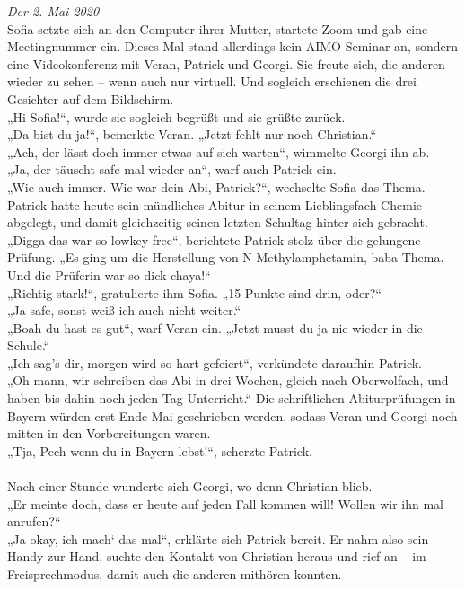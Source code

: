 \documentclass[oneside]{memoir}
\begin{document}
\textit{Der 2. Mai 2020} \\
Sofia setzte sich an den Computer ihrer Mutter, startete Zoom und gab eine Meetingnummer ein. Dieses Mal stand allerdings kein AIMO-Seminar an, sondern eine Videokonferenz mit Veran, Patrick und Georgi. Sie freute sich, die anderen wieder zu sehen – wenn auch nur virtuell. Und sogleich erschienen die drei Gesichter auf dem Bildschirm. \\
„Hi Sofia!“, wurde sie sogleich begrüßt und sie grüßte zurück. \\
„Da bist du ja!“, bemerkte Veran. „Jetzt fehlt nur noch Christian.“ \\
„Ach, der lässt doch immer etwas auf sich warten“, wimmelte Georgi ihn ab. \\
„Ja, der täuscht safe mal wieder an“, warf auch Patrick ein. \\
„Wie auch immer. Wie war dein Abi, Patrick?“, wechselte Sofia das Thema. Patrick hatte 
heute sein mündliches Abitur in seinem Lieblingsfach Chemie abgelegt, und damit 
gleichzeitig seinen letzten Schultag hinter sich gebracht. \\
„Digga das war so lowkey free“, berichtete Patrick stolz über die gelungene Prüfung. „Es ging um die Herstellung von N-Methylamphetamin, baba Thema. Und die Prüferin war so dick chaya!“ \\
„Richtig stark!“, gratulierte ihm Sofia. „15 Punkte sind drin, oder?“ \\
„Ja safe, sonst weiß ich auch nicht weiter.“ \\
„Boah du hast es gut“, warf Veran ein. „Jetzt musst du ja nie wieder in die Schule.“ \\
„Ich sag's dir, morgen wird so hart gefeiert“, verkündete daraufhin Patrick. \\
„Oh mann, wir schreiben das Abi in drei Wochen, gleich nach Oberwolfach, und haben bis 
dahin noch jeden Tag Unterricht.“ Die schriftlichen Abiturprüfungen in Bayern würden erst 
Ende Mai geschrieben werden, sodass Veran und Georgi noch mitten in den Vorbereitungen waren. \\
„Tja, Pech wenn du in Bayern lebst!“, scherzte Patrick. \\ \\
Nach einer Stunde wunderte sich Georgi, wo denn Christian blieb. \\
„Er meinte doch, dass er heute auf jeden Fall kommen will! Wollen wir ihn mal anrufen?“ \\
„Ja okay, ich mach‘ das mal“, erklärte sich Patrick bereit. Er nahm also sein Handy zur Hand, suchte den Kontakt von Christian heraus und rief an -- im Freisprechmodus, damit auch die anderen mithören konnten.
\end{document}
